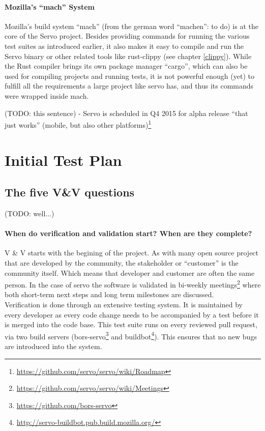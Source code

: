 \documentclass{scrartcl}
\newcommand{\todo}[1] {{\color{red}(TODO: #1)}}
\begin{document}
\paragraph{Mozilla's ``mach'' System}
Mozilla's build system ``mach'' (from the german word ``machen'': to do) is at the core of the Servo project. Besides providing commands for running the various test suites as introduced earlier, it also makes it easy to compile and run the Servo binary or other related tools like rust-clippy (see chapter \ref{clippy}). While the Rust compiler brings its own package manager ``cargo'', which can also be used for compiling projects and running tests, it is not powerful enough (yet) to fulfill all the requirements a large project like servo has, and thus its commands were wrapped inside mach.

\todo{this sentence}
- Servo is scheduled in Q4 2015 for alpha release ``that just works'' (mobile, but also other platforms)\footnote{\url{https://github.com/servo/servo/wiki/Roadmap}}




\section{Initial Test Plan}


\subsection{The five V\&V questions}
\todo{well...}

\paragraph{When do verification and validation start? When are they complete?}
V \& V starts with the begining of the project. As with many open source project that are developed by the community, the stakeholder or ``customer'' is the community itself. Which means that developer and customer are often the same person. In the case of servo the software is validated in bi-weekly meetings\footnote{\url{https://github.com/servo/servo/wiki/Meetings}} where both short-term next steps and long term milestones are discussed.\\
  
  Verification is done through an extensive testing system. It is maintained by every developer as every code change needs to be accompanied by a test before it is merged into the code base. This test suite runs on every reviewed pull request, via two build servers (bors-servo\footnote{\url{https://github.com/bors-servo}} and buildbot\footnote{\url{http://servo-buildbot.pub.build.mozilla.org/}}). This ensures that no new bugs are introduced into the system.\\
  
\end{document}
